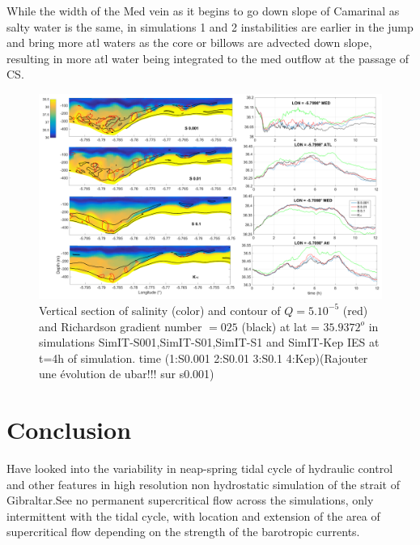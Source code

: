 While the width of the Med vein as it begins to go down slope of Camarinal as salty water is the same, in simulations 1 and 2 instabilities are earlier in the jump and bring more atl waters as the core or billows are advected down slope, resulting in more atl water being integrated to the med outflow at the passage of CS. 






\begin{figure}[!h]
 \includegraphics[width=\textwidth]{./GBR3D/Figsmago.png}
 \caption {Vertical section of salinity (color) and contour of $Q=5.10^{-5}$ (red) and Richardson gradient number $=025$ (black) at lat = $35.9372^o$ in simulations SimIT-S001,SimIT-S01,SimIT-S1 and SimIT-Kep IES at t=4h of simulation. time  (1:S0.001  2:S0.01  3:S0.1 4:Kep)(Rajouter une évolution de ubar!!! sur s0.001)}
 \label{Fig3Dsch}
\end{figure}

\section{Conclusion}

Have looked into the variability in neap-spring tidal cycle of hydraulic control and other features in high resolution non hydrostatic simulation of the strait of Gibraltar.See no permanent supercritical flow across the simulations, only intermittent with the tidal cycle, with location and extension of the area of supercritical flow depending on the strength of the barotropic currents.

